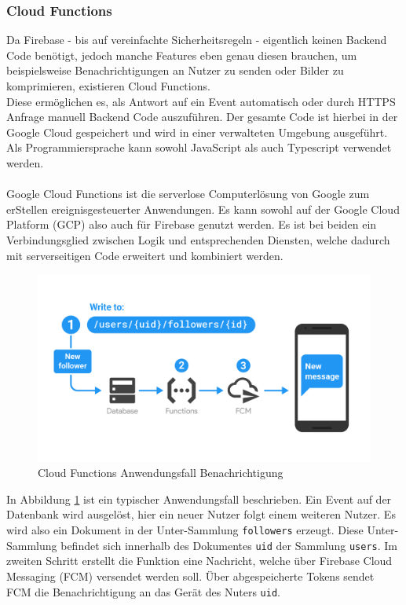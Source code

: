\subsubsection{Cloud Functions}
\label{sec:cloudfunctions}
Da Firebase - bis auf vereinfachte Sicherheitsregeln - eigentlich keinen Backend Code benötigt, jedoch manche Features eben genau diesen brauchen, um beispielsweise Benachrichtigungen an Nutzer zu senden oder Bilder zu komprimieren, existieren Cloud Functions.\\
Diese ermöglichen es, als Antwort auf ein Event automatisch oder durch HTTPS Anfrage manuell Backend Code auszuführen.
Der gesamte Code ist hierbei in der Google Cloud gespeichert und wird in einer verwalteten Umgebung ausgeführt.
Als Programmiersprache kann sowohl JavaScript als auch Typescript verwendet werden.\\
\\
\glqq Google Cloud Functions ist die serverlose Computerlösung von Google zum erStellen ereignisgesteuerter Anwendungen.\grqq \cite{firebase2021} 
Es kann sowohl auf der Google Cloud Platform (GCP) also auch für Firebase genutzt werden. 
Es ist bei beiden ein Verbindungsglied zwischen Logik und entsprechenden Diensten, welche dadurch mit serverseitigen Code erweitert und kombiniert werden.
\begin{figure}[htb]
	\begin{center}
		\includegraphics[scale=0.2]{images/firebase_functions_notify.png}
	\end{center}
	\caption{Cloud Functions Anwendungsfall Benachrichtigung}
	\label{fig:functions_notifications}
\end{figure}
In Abbildung \ref{fig:functions_notifications} ist ein typischer Anwendungsfall beschrieben. 
Ein Event auf der Datenbank wird ausgelöst, hier ein neuer Nutzer folgt einem weiteren Nutzer.
Es wird also ein Dokument in der Unter-Sammlung \texttt{followers} erzeugt. Diese Unter-Sammlung befindet sich innerhalb des Dokumentes \texttt{uid} der Sammlung \texttt{users}.
Im zweiten Schritt erstellt die Funktion eine Nachricht, welche über Firebase Cloud Messaging (FCM) versendet werden soll.
Über abgespeicherte Tokens sendet FCM die Benachrichtigung an das Gerät des Nuters \texttt{uid}.\cite{firebase2021}
